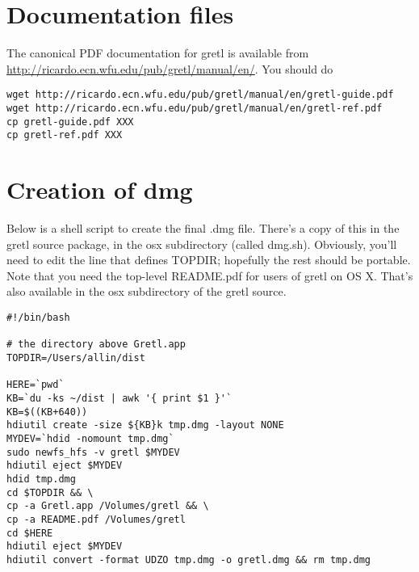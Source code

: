 \documentclass{article}
\begin{document}
\section{Documentation files}

The canonical PDF documentation for gretl is available from
\url{http://ricardo.ecn.wfu.edu/pub/gretl/manual/en/}.  You should do

\begin{verbatim}
wget http://ricardo.ecn.wfu.edu/pub/gretl/manual/en/gretl-guide.pdf
wget http://ricardo.ecn.wfu.edu/pub/gretl/manual/en/gretl-ref.pdf
cp gretl-guide.pdf XXX
cp gretl-ref.pdf XXX

\end{verbatim}


\section{Creation of dmg}

Below is a shell script to create the final .dmg file.  There's a copy
of this in the gretl source package, in the osx subdirectory (called
dmg.sh).  Obviously, you'll need to edit the line that defines TOPDIR;
hopefully the rest should be portable.  Note that you need the
top-level README.pdf for users of gretl on OS X.  That's also
available in the osx subdirectory of the gretl source.

\begin{verbatim}
#!/bin/bash

# the directory above Gretl.app
TOPDIR=/Users/allin/dist

HERE=`pwd`
KB=`du -ks ~/dist | awk '{ print $1 }'`
KB=$((KB+640))
hdiutil create -size ${KB}k tmp.dmg -layout NONE
MYDEV=`hdid -nomount tmp.dmg`
sudo newfs_hfs -v gretl $MYDEV
hdiutil eject $MYDEV
hdid tmp.dmg
cd $TOPDIR && \
cp -a Gretl.app /Volumes/gretl && \
cp -a README.pdf /Volumes/gretl
cd $HERE
hdiutil eject $MYDEV
hdiutil convert -format UDZO tmp.dmg -o gretl.dmg && rm tmp.dmg

\end{verbatim}
\end{document}
